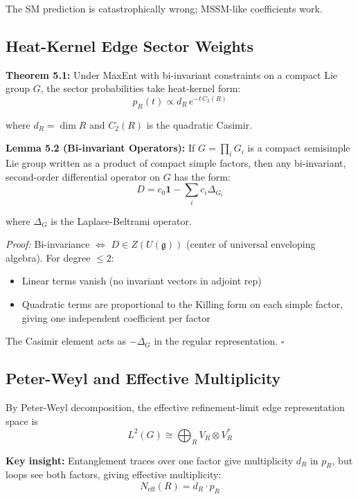 The SM prediction is catastrophically wrong; MSSM-like coefficients work.

\subsection{Heat-Kernel Edge Sector Weights}\label{53-heat-kernel-edge-sector-weights}

\textbf{Theorem 5.1:} Under MaxEnt with bi-invariant constraints on a compact Lie group \(G\), the sector probabilities take heat-kernel form: \[p_R(t) \propto d_R \, e^{-t \, C_2(R)}\]

where \(d_R = \dim R\) and \(C_2(R)\) is the quadratic Casimir.

\textbf{Lemma 5.2 (Bi-invariant Operators):} If \(G=\prod_i G_i\) is a compact semisimple Lie group written as a product of compact simple factors, then any bi-invariant, second-order differential operator on \(G\) has the form: \[D = c_0 \mathbf{1} - \sum_i c_i \Delta_{G_i}\]

where \(\Delta_G\) is the Laplace-Beltrami operator.

\emph{Proof:} Bi-invariance \(\Leftrightarrow\) \(D \in Z(U(\mathfrak{g}))\) (center of universal enveloping algebra). For degree \(\leq 2\):

\begin{itemize}
\tightlist
\item
 Linear terms vanish (no invariant vectors in adjoint rep)
\item
 Quadratic terms are proportional to the Killing form on each simple factor, giving one independent coefficient per factor
\end{itemize}

The Casimir element acts as \(-\Delta_G\) in the regular representation. \(\square\)

\subsection{Peter-Weyl and Effective Multiplicity}\label{54-peter-weyl-and-effective-multiplicity}

By Peter-Weyl decomposition, the effective refinement-limit edge representation space is
\[L^2(G) \cong \bigoplus_R V_R \otimes V_R^*\]

\textbf{Key insight:} Entanglement traces over one factor give multiplicity \(d_R\) in \(p_R\), but loops see both factors, giving effective multiplicity: \[N_{\text{eff}}(R) = d_R \cdot p_R\]


